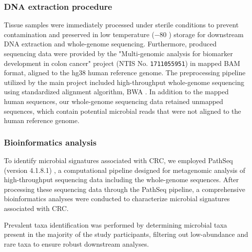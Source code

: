 \documentclass[11pt, a4paper, onecolumn, oneside]{report}
\begin{document}
            \subsubsection{DNA extraction procedure}
                Tissue samples were immediately processed under sterile conditions to prevent contamination and preserved in low temperature ($-$80 \textcelsius) storage for downstream DNA extraction and whole-genome sequencing. Furthermore, produced sequencing data were provided by the "Multi-genomic analysis for biomarker development in colon cancer" project (NTIS No. \texttt{1711055951}) in mapped BAM format, aligned to the hg38 human reference genome. The preprocessing pipeline utilized by the main project included high-throughput whole-genome sequencing using standardized alignment algorithm, BWA \cite{BWA-1}. In addition to the mapped human sequences, our whole-genome sequencing data retained unmapped sequences, which contain potential microbial reads that were not aligned to the human reference genome.

            \subsubsection{Bioinformatics analysis}
                To identify microbial signatures associated with CRC, we employed PathSeq (version 4.1.8.1) \cite{PathSeq-1, PathSeq-2}, a computational pipeline designed for metagenomic analysis of high-throughput sequencing data including the whole-genome sequences. After processing these sequencing data through the PathSeq pipeline, a comprehensive bioinformatics analyses were conducted to characterize microbial signatures associated with CRC.

                Prevalent taxa identification was performed by determining microbial taxa present in the majority of the study participants, filtering out low-abundance and rare taxa to ensure robust downstream analyses.
\end{document}
